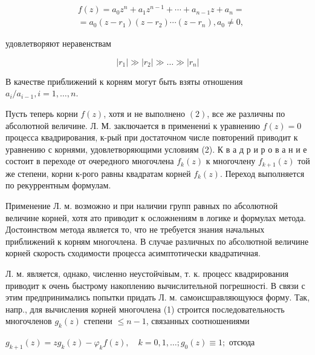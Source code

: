 \documentclass[10pt]{article}
\begin{document}
\[

\begin{aligned}

& f(z)=a_{0} z^{n}+a_{1} z^{n-1}+\cdots+a_{n-1} z+a_{n}= \\

& =a_{0}\left(z-r_{1}\right)\left(z-r_{2}\right) \cdots\left(z-r_{n}\right), a_{0} \neq 0,

\end{aligned}

\]



удовлетворяют неравенствам



\[

\left|r_{1}\right| \gg\left|r_{2}\right| \gg \ldots \gg\left|r_{n}\right|

\]



В качестве приближений к корням могут быть взяты отношения $a_{i} / a_{i-1}, i=1, \ldots, n$.



Пусть теперь корни $f(z)$, хотя и не выполнено $(2)$, все же различны по абсолютной величине. Л. М. заключается в применениі к уравнению $f(z)=0$ процесса квадрирования, к-рый при достаточном числе повторений приводит к уравнению с корнями, удовлетворяющими условиям (2). К в а д р и р о в а н и е состоит в переходе от очередного многочлена $f_{k}(z)$ к многочлену $f_{k+1}(z)$ той же степени, корни к-рого равны квадратам корней $f_{k}(z)$. Переход выполняется по рекуррентным формулам.



Применение Л. м. возможно и при наличии групп равных по абсолютной величине корней, хотя ато приводит к осложнениям в логике и формулах метода. Достоинством метода является то, что не требуется знания начальных приближений к корням многочлена. В случае различных по абсолютной величине корней скорость сходимости процесса асимптотически квадратичная.



Л. м. является, однако, численно неустойчівым, т. к. процесс квадрирования приводит к очень быстрому накоплению вычислительной погрешності. В связи с этим предпринимались попытки придать Л. м. самоисшравляющуюся форму. Так, напр., для вычисления корней многочлена (1) строится последовательность многочленов $g_{k}(z)$ степени $\leqslant n-1$, связанных соотношениями



$g_{k+1}(z)=z g_{k}(z)-\varphi_{k} f(z), \quad k=0,1, \ldots ; g_{0}(z) \equiv 1 ;$ отсюда
\end{document}
